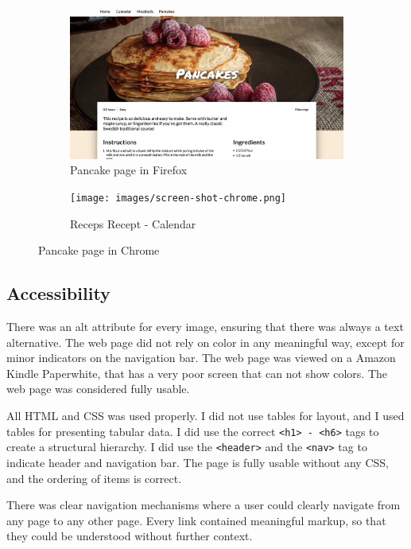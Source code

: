 \documentclass[a4paper]{scrartcl}
\begin{document}
\begin{figure}
	\centering
	\begin{subfigure}[b]{0.45\linewidth}
		\includegraphics[width=\linewidth]{images/screen-shot-firefox.jpg}
		\caption{Pancake page in Firefox}
	\end{subfigure}
	\begin{subfigure}[b]{0.45\linewidth}
		\texttt{[image: images/screen-shot-chrome.png]}
		\caption{Receps Recept - Calendar}
	\end{subfigure}
	\caption{Pancake page in Chrome}
	\label{fig:browser-comparison}
\end{figure}

\subsection{Accessibility}

There was an alt attribute for every image, ensuring that there was always a text alternative. The web page did not rely on color in any meaningful way, except for minor indicators on the navigation bar. The web page was viewed on a Amazon Kindle Paperwhite, that has a very poor screen that can not show colors. The web page was considered fully usable.

All HTML and CSS was used properly. I did not use tables for layout, and I used tables for presenting tabular data. I did use the correct \texttt{<h1> - <h6>} tags to create a structural hierarchy. I did use the \texttt{<header>} and the \texttt{<nav>} tag to indicate header and navigation bar. The page is fully usable without any CSS, and the ordering of items is correct.

There was clear navigation mechanisms where a user could clearly navigate from any page to any other page. Every link contained meaningful markup, so that they could be understood without further context.
\end{document}
